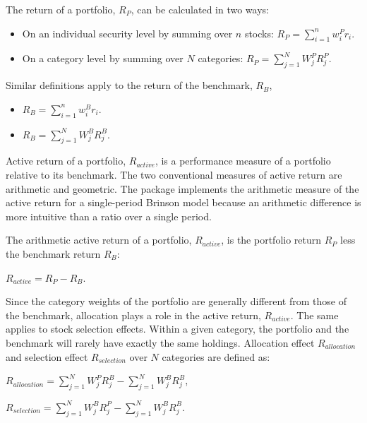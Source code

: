 The return of a portfolio, $R_P$, can be calculated in two ways:

\begin{itemize}
  \item On an individual security level by summing over $n$ stocks: $R_P =
    \sum\limits_{i = 1}^n w^P_ir_i$.
  \item On a category level by summing over $N$ categories: $R_P = \sum\limits_{j =
    1}^N W^P_jR^P_j$.
\end{itemize}

Similar definitions apply to the return of the benchmark, $R_B$,

\begin{itemize}
  \item $R_B = \sum\limits_{i = 1}^n w^B_ir_i$.
  \item $R_B = \sum\limits_{j = 1}^N W^B_jR^B_j$.
\end{itemize}

Active return of a portfolio, $R_{active}$, is a performance measure
of a portfolio relative to its benchmark. The two conventional
measures of active return are arithmetic and geometric.  The 
package implements the arithmetic measure of the active return for a
single-period Brinson model because an arithmetic difference is more
intuitive than a ratio over a single period.

The arithmetic active return of a portfolio, $R_{active}$, is the
portfolio return $R_P$ less the benchmark return $R_B$:

\begin{center}
  $R_{active} = R_P - R_B$.
\end{center}

Since the category weights of the portfolio are generally different
from those of the benchmark, allocation plays a role in the active
return, $R_{active}$. The same applies to stock selection effects. 
Within a given category, the portfolio and the benchmark will rarely 
have exactly the same holdings. Allocation effect
$R_{allocation}$ and selection effect $R_{selection}$ over $N$
categories are defined as:
\begin{center}
  $R_{allocation} = \sum\limits_{j = 1}^N W^P_jR^B_j - \sum\limits_{j
    = 1}^N W^B_jR^B_j$,
\end{center}
\begin{center}
  $R_{selection} = \sum\limits_{j = 1}^N W^B_jR^P_j - \sum\limits_{j =
    1}^N W^B_jR^B_j$.
\end{center}

